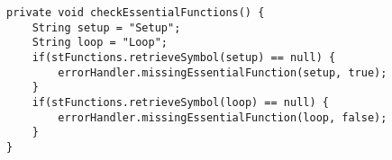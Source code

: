 \begin{lstlisting}[caption={Private functions in the symbol table visitor for verifying Setup and Loop declaration.}, label={code:STV:EssentialFunc}]
private void checkEssentialFunctions() {
    String setup = "Setup";
    String loop = "Loop";
    if(stFunctions.retrieveSymbol(setup) == null) {
        errorHandler.missingEssentialFunction(setup, true);
    }
    if(stFunctions.retrieveSymbol(loop) == null) {
        errorHandler.missingEssentialFunction(loop, false);
    }
}
\end{lstlisting}